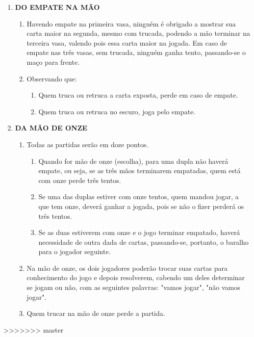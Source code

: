 \begin{article}
\begin{enumerate}[noitemsep]
		\item \textbf{DO EMPATE NA MÃO}
		\begin{enumerate}[noitemsep]
			\item Havendo empate na primeira vasa, ninguém é obrigado a mostrar sua carta maior na segunda, mesmo com trucada, podendo a mão terminar na terceira vasa, valendo pois essa carta maior na jogada. Em caso de empate nas três vasas, sem trucada, ninguém ganha tento, passando-se o maço para frente.
			\item Observando que:
			\begin{enumerate}[noitemsep]
				\item Quem truca ou retruca a carta exposta, perde em caso de empate.
				\item Quem truca ou retruca no escuro, joga pelo empate.
			\end{enumerate}
		\end{enumerate}

		\item \textbf{DA MÃO DE ONZE}
		\begin{enumerate}[noitemsep]
			\item Todas as partidas serão em doze pontos.
			\begin{enumerate}[noitemsep]
				\item Quando for mão de onze (escolha), para uma dupla não haverá empate, ou seja, se as três mãos terminarem empatadas, quem está com onze perde três tentos.
				\item Se uma das duplas estiver com onze tentos, quem mandou jogar, a que tem onze, deverá ganhar a jogada, pois se não o fizer perderá os três tentos.
				\item Se as duas estiverem com onze e o jogo terminar empatado, haverá necessidade de outra dada de cartas, passando-se, portanto, o baralho para o jogador seguinte.
			\end{enumerate}
			\item Na mão de onze, os dois jogadores poderão trocar suas cartas para conhecimento do jogo e depois resolverem, cabendo um deles determinar se jogam ou não, com as seguintes palavras: "vamos jogar", "não vamos jogar".
			\item Quem trucar na mão de onze perde a partida.
		\end{enumerate}
	\end{enumerate}
>>>>>>> master
\end{article}
